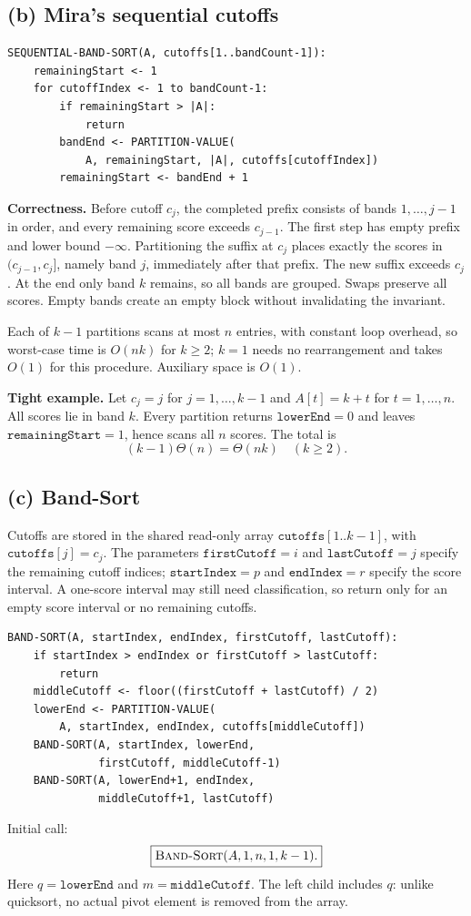 \documentclass[11pt,a4paper]{article}
\newcommand{\parttitle}[1]{\Needspace{10\baselineskip}\subsection*{#1}}
\newcommand{\proc}[1]{\textsc{#1}}
\begin{document}
\parttitle{(b) Mira's sequential cutoffs}
\begin{lstlisting}
SEQUENTIAL-BAND-SORT(A, cutoffs[1..bandCount-1]):
    remainingStart <- 1
    for cutoffIndex <- 1 to bandCount-1:
        if remainingStart > |A|:
            return
        bandEnd <- PARTITION-VALUE(
            A, remainingStart, |A|, cutoffs[cutoffIndex])
        remainingStart <- bandEnd + 1
\end{lstlisting}
\textbf{Correctness.} Before cutoff $c_j$, the completed prefix consists of bands $1,\ldots,j-1$ in order, and every remaining score exceeds $c_{j-1}$. The first step has empty prefix and lower bound $-\infty$. Partitioning the suffix at $c_j$ places exactly the scores in $(c_{j-1},c_j]$, namely band $j$, immediately after that prefix. The new suffix exceeds $c_j$. At the end only band $k$ remains, so all bands are grouped. Swaps preserve all scores. Empty bands create an empty block without invalidating the invariant.

Each of $k-1$ partitions scans at most $n$ entries, with constant loop overhead, so worst-case time is $O(nk)$ for $k\ge2$; $k=1$ needs no rearrangement and takes $O(1)$ for this procedure. Auxiliary space is $O(1)$.

\textbf{Tight example.} Let $c_j=j$ for $j=1,\ldots,k-1$ and $A[t]=k+t$ for $t=1,\ldots,n$. All scores lie in band $k$. Every partition returns $\mathtt{lowerEnd}=0$ and leaves $\mathtt{remainingStart}=1$, hence scans all $n$ scores. The total is
\[
(k-1)\Theta(n)=\boxed{\Theta(nk)}\quad(k\ge2).
\]

\parttitle{(c) Band-Sort}
Cutoffs are stored in the shared read-only array $\mathtt{cutoffs}[1..k-1]$, with $\mathtt{cutoffs}[j]=c_j$. The parameters $\mathtt{firstCutoff}=i$ and $\mathtt{lastCutoff}=j$ specify the remaining cutoff indices; $\mathtt{startIndex}=p$ and $\mathtt{endIndex}=r$ specify the score interval. A one-score interval may still need classification, so return only for an empty score interval or no remaining cutoffs.
\begin{lstlisting}
BAND-SORT(A, startIndex, endIndex, firstCutoff, lastCutoff):
    if startIndex > endIndex or firstCutoff > lastCutoff:
        return
    middleCutoff <- floor((firstCutoff + lastCutoff) / 2)
    lowerEnd <- PARTITION-VALUE(
        A, startIndex, endIndex, cutoffs[middleCutoff])
    BAND-SORT(A, startIndex, lowerEnd,
              firstCutoff, middleCutoff-1)
    BAND-SORT(A, lowerEnd+1, endIndex,
              middleCutoff+1, lastCutoff)
\end{lstlisting}
Initial call:
\[
\boxed{\proc{Band-Sort}(A,1,n,1,k-1).}
\]
Here $q=\mathtt{lowerEnd}$ and $m=\mathtt{middleCutoff}$. The left child includes $q$: unlike quicksort, no actual pivot element is removed from the array.
\end{document}
